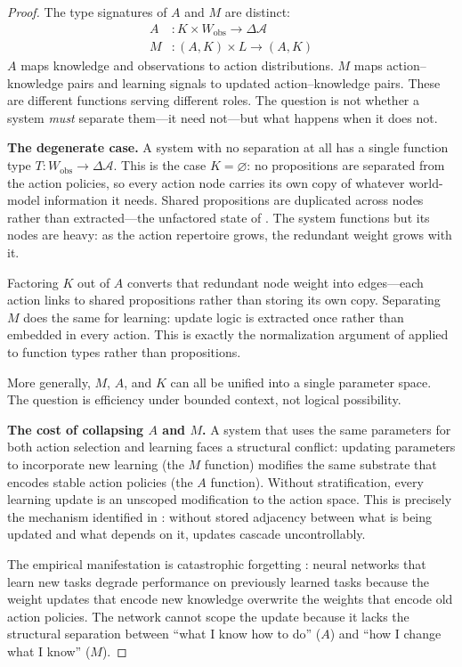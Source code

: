 \documentclass[11pt]{article}
\theoremstyle{definition}
\theoremstyle{remark}
\begin{document}
\begin{proof}
The type signatures of $A$ and $M$ are distinct:
\begin{align*}
A &: K \times W_{\mathrm{obs}} \to \Delta \mathcal{A} \\
M &: (A, K) \times L \to (A, K)
\end{align*}
$A$ maps knowledge and observations to action distributions. $M$ maps
action--knowledge pairs and learning signals to updated
action--knowledge pairs. These are different functions serving
different roles. The question is not whether a system \emph{must}
separate them---it need not---but what happens when it does not.

\textbf{The degenerate case.}
A system with no separation at all has a single function type
$T : W_{\mathrm{obs}} \to \Delta\mathcal{A}$.
This is the case $K = \varnothing$: no propositions are separated
from the action policies, so every action node carries its own copy
of whatever world-model information it needs. Shared propositions
are duplicated across nodes rather than extracted---the unfactored
state of \cite{McCarthy2026a}. The system functions but its nodes
are heavy: as the action repertoire grows, the redundant weight
grows with it.

Factoring $K$ out of $A$ converts that redundant node weight into
edges---each action links to shared propositions rather than
storing its own copy. Separating $M$ does the same for learning:
update logic is extracted once rather than embedded in every action.
This is exactly the normalization argument of \cite{McCarthy2026c}
applied to function types rather than propositions.

More generally, $M$, $A$, and $K$ can all be unified into a single
parameter space. The question is efficiency under bounded context,
not logical possibility.

\textbf{The cost of collapsing $A$ and $M$.}
A system that uses the same parameters for both action selection and
learning faces a structural conflict: updating parameters to
incorporate new learning (the $M$ function) modifies the same
substrate that encodes stable action policies (the $A$ function).
Without stratification, every learning update is an unscoped
modification to the action space. This is precisely the mechanism
identified in \cite{McCarthy2026a}: without stored adjacency between
what is being updated and what depends on it, updates cascade
uncontrollably.

The empirical manifestation is catastrophic forgetting
\cite{Kirkpatrick2017}: neural networks that learn new tasks degrade
performance on previously learned tasks because the weight updates
that encode new knowledge overwrite the weights that encode old
action policies. The network cannot scope the update because it lacks
the structural separation between ``what I know how to do'' ($A$)
and ``how I change what I know'' ($M$).


\end{proof}
\end{document}

